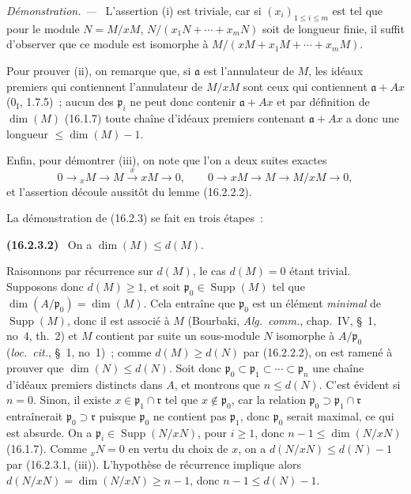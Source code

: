 \documentclass[10pt,oneside]{book}
\makeatletter
\newcommand{\setmanualcurrentlabel}[1]{\def\@currentlabel{#1}}
\newcommand{\oldpage}[2][]{%
  \setcounter{footnote}{0}%
  \marginpar{\scriptsize\textbf{#1}~|~#2}\ignorespaces}
\newenvironment{env}[1][]{\setmanualcurrentlabel{#1}\par\medskip\noindent\textbf{(#1)}\ }{\par}
\newenvironment{proof}{%
  \par\medskip\noindent\textit{Démonstration. ---\ }}{\par}
\makeatother
\begin{document}
\begin{proof}
L'assertion (i) est triviale, car si $(x_i)_{1\leq i\leq m}$ est tel que pour
le module $N=M/xM$, $N/(x_1N+\cdots+x_mN)$ soit de longueur finie, il suffit
d'observer que ce module est isomorphe à
$M/(xM+x_1M+\cdots+x_mM)$.

Pour prouver (ii), on remarque que, si $\mathfrak{a}$ est l'annulateur de
$M$, les idéaux premiers qui contiennent l'annulateur de $M/xM$ sont ceux qui
contiennent $\mathfrak{a}+Ax$ ($0_{\mathrm I}$, 1.7.5)~; aucun des
$\mathfrak{p}_i$ ne peut donc contenir $\mathfrak{a}+Ax$ et par définition de
$\dim(M)$ (16.1.7) toute chaîne d'idéaux premiers contenant
$\mathfrak{a}+Ax$ a donc une longueur $\leq\dim(M)-1$.

\oldpage[0\textsubscript{IV-1}]{27}

Enfin, pour démontrer (iii), on note que l'on a deux suites exactes
\[
  0\to{}_xM\to M\xrightarrow{x}xM\to0,\qquad
  0\to xM\to M\to M/xM\to0,
\]
et l'assertion découle aussitôt du lemme (16.2.2.2).
\end{proof}

La démonstration de (16.2.3) se fait en trois étapes~:

\begin{env}[16.2.3.2]
\label{0.16.2.3.2-fr}
On a $\dim(M)\leq d(M)$.
\end{env}

Raisonnons par récurrence sur $d(M)$, le cas $d(M)=0$ étant trivial.
Supposons donc $d(M)\geq1$, et soit $\mathfrak{p}_0\in\operatorname{Supp}(M)$
tel que $\dim(A/\mathfrak{p}_0)=\dim(M)$. Cela entraîne que
$\mathfrak{p}_0$ est un élément \emph{minimal} de $\operatorname{Supp}(M)$,
donc il est associé à $M$ (Bourbaki, \emph{Alg.~comm.}, chap.~IV, \S~1,
no~4, th.~2) et $M$ contient par suite un sous-module $N$ isomorphe à
$A/\mathfrak{p}_0$ (\emph{loc.~cit.}, \S~1, no~1)~; comme $d(M)\geq d(N)$
par (16.2.2.2), on est ramené à prouver que $\dim(N)\leq d(N)$. Soit donc
$\mathfrak{p}_0\subset\mathfrak{p}_1\subset\cdots\subset\mathfrak{p}_n$ une
chaîne d'idéaux premiers distincts dans $A$, et montrons que $n\leq d(N)$.
C'est évident si $n=0$. Sinon, il existe
$x\in\mathfrak{p}_1\cap\mathfrak{r}$ tel que $x\notin\mathfrak{p}_0$, car la
relation $\mathfrak{p}_0\supset\mathfrak{p}_1\cap\mathfrak{r}$ entraînerait
$\mathfrak{p}_0\supset\mathfrak{r}$ puisque $\mathfrak{p}_0$ ne contient pas
$\mathfrak{p}_1$, donc $\mathfrak{p}_0$ serait maximal, ce qui est absurde.
On a $\mathfrak{p}_i\in\operatorname{Supp}(N/xN)$, pour $i\geq1$, donc
$n-1\leq\dim(N/xN)$ (16.1.7). Comme ${}_xN=0$ en vertu du choix de $x$, on a
$d(N/xN)\leq d(N)-1$ par (16.2.3.1, (iii)). L'hypothèse de récurrence implique
alors $d(N/xN)=\dim(N/xN)\geq n-1$, donc $n-1\leq d(N)-1$.
\end{document}
